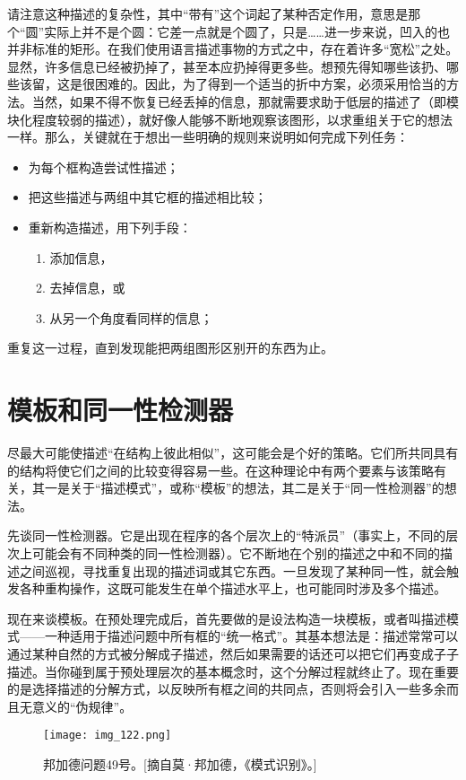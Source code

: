请注意这种描述的复杂性，其中“带有”这个词起了某种否定作用，意思是那个“圆”实际上并不是个圆：它差一点就是个圆了，只是……进一步来说，凹入的也并非标准的矩形。在我们使用语言描述事物的方式之中，存在着许多“宽松”之处。显然，许多信息已经被扔掉了，甚至本应扔掉得更多些。想预先得知哪些该扔、哪些该留，这是很困难的。因此，为了得到一个适当的折中方案，必须采用恰当的方法。当然，如果不得不恢复已经丢掉的信息，那就需要求助于低层的描述了（即模块化程度较弱的描述），就好像人能够不断地观察该图形，以求重组关于它的想法一样。那么，关键就在于想出一些明确的规则来说明如何完成下列任务：
\begin{itemize}
\item 为每个框构造尝试性描述；
\item 把这些描述与两组中其它框的描述相比较；
\item 重新构造描述，用下列手段：
\begin{enumerate}[labelindent=0pt,label=(\roman*)]
  \item 添加信息，
  \item 去掉信息，或
  \item 从另一个角度看同样的信息；
\end{enumerate}
\end{itemize}
重复这一过程，直到发现能把两组图形区别开的东西为止。

\section{模板和同一性检测器}

尽最大可能使描述“在结构上彼此相似”，这可能会是个好的策略。它们所共同具有的结构将使它们之间的比较变得容易一些。在这种理论中有两个要素与该策略有关，其一是关于“描述模式”，或称“模板”的想法，其二是关于“同一性检测器”的想法。

先谈同一性检测器。它是出现在程序的各个层次上的“特派员”（事实上，不同的层次上可能会有不同种类的同一性检测器）。它不断地在个别的描述之中和不同的描述之间巡视，寻找重复出现的描述词或其它东西。一旦发现了某种同一性，就会触发各种重构操作，这既可能发生在单个描述水平上，也可能同时涉及多个描述。

现在来谈模板。在预处理完成后，首先要做的是设法构造一块模板，或者叫描述模式——一种适用于描述问题中所有框的“统一格式”。其基本想法是：描述常常可以通过某种自然的方式被分解成子描述，然后如果需要的话还可以把它们再变成子子描述。当你碰到属于预处理层次的基本概念时，这个分解过程就终止了。现在重要的是选择描述的分解方式，以反映所有框之间的共同点，否则将会引入一些多余而且无意义的“伪规律”。

\begin{figure}
\texttt{[image: img\_122.png]}
\caption[邦加德问题49号。]
  {邦加德问题49号。[摘自莫·邦加德，《模式识别》。]}
\end{figure}

